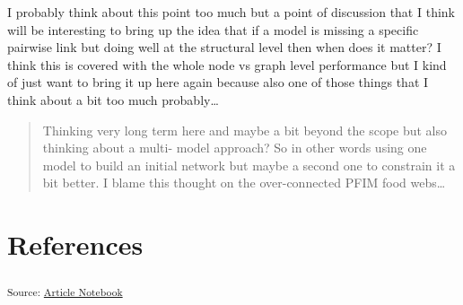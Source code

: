 \documentclass[
  letterpaper,
  DIV=11,
  numbers=noendperiod]{scrartcl}
\begin{document}
I probably think about this point too much but a point of discussion
that I think will be interesting to bring up the idea that if a model is
missing a specific pairwise link but doing well at the structural level
then when does it matter? I think this is covered with the whole node vs
graph level performance but I kind of just want to bring it up here
again because also one of those things that I think about a bit too much
probably\ldots{}

\begin{quote}
Thinking very long term here and maybe a bit beyond the scope but also
thinking about a multi- model approach? So in other words using one
model to build an initial network but maybe a second one to constrain it
a bit better. I blame this thought on the over-connected PFIM food
webs\ldots{}
\end{quote}

\section*{References}\label{references}

\textsubscript{Source:
\href{https://BecksLab.github.io/ms_t_is_for_topology/index.qmd.html}{Article
Notebook}}
\end{document}
